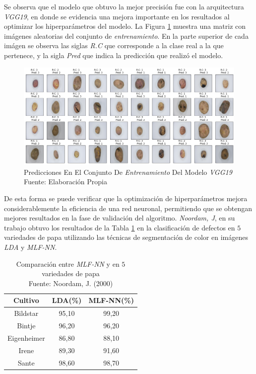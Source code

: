 Se observa que el modelo que obtuvo la mejor precisión fue con la arquitectura \textit{VGG19}, en donde se evidencia una mejora importante en los resultados al optimizar los hiperparámetros del modelo. La Figura \ref{fig:predvgg19} muestra una matriz con imágenes aleatorias del conjunto de \textit{entrenamiento}. En la parte superior de cada imágen se observa las siglas \textit{R.C} que corresponde a la clase real a la que pertenece, y la sigla \textit{Pred} que indica la predicción que realizó el modelo.

\begin{figure}[ht]
	\centering
	\includegraphics[scale=0.42]{Figs/506.png}
	\caption{Predicciones En El Conjunto De \textit{Entrenamiento} Del Modelo \textit{VGG19} \\ Fuente: Elaboración Propia}
	\label{fig:predvgg19}
\end{figure}

De esta forma se puede verificar que la optimización de hiperparámetros mejora considerablemente la eficiencia de una red neuronal, permitiendo que se obtengan mejores resultados en la fase de validación del algoritmo. \textit{Noordam, J}, en su trabajo obtuvo los resultados de la Tabla \ref{tab:noordam} en la clasificación de defectos en $5$ variedades de papa utilizando las técnicas de segmentación de color en imágenes  \textit{LDA} y \textit{MLF-NN}.

\begin{table}[ht]
	\centering
	\begin{tabular}{|c|c|c|}
		\hline
		Cultivo     & LDA(\%) & MLF-NN(\%) \\ \hline
		Bildstar    & 95,10   & 99,20      \\ \hline
		Bintje      & 96,20   & 96,20      \\ \hline
		Eigenheimer & 86,80   & 88,10      \\ \hline
		Irene       & 89,30   & 91,60       \\ \hline
		Sante       & 98,60    & 98,70       \\ \hline
	\end{tabular}
	\caption{Comparación entre \textit{MLF-NN} y  en $5$ variedades de papa \\ Fuente: Noordam, J. (2000)}
	\label{tab:noordam}
\end{table}

